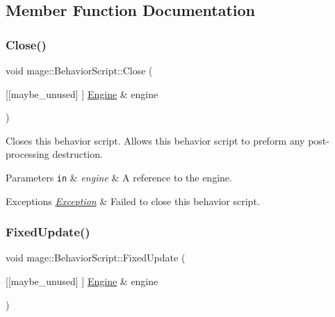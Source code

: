 \subsection{Member Function Documentation}
\hypertarget{classmage_1_1_behavior_script_a5a8d2d38b369e193bf8cc20a74708397}{}\label{classmage_1_1_behavior_script_a5a8d2d38b369e193bf8cc20a74708397} 
\subsubsection{\texorpdfstring{Close()}{Close()}}
{\footnotesize\ttfamily void mage\+::\+Behavior\+Script\+::\+Close (\begin{DoxyParamCaption}\item[{\mbox{[}\mbox{[}maybe\+\_\+unused\mbox{]} \mbox{]} \hyperlink{classmage_1_1_engine}{Engine} \&}]{engine }\end{DoxyParamCaption})\hspace{0.3cm}{\ttfamily [virtual]}}

Closes this behavior script. Allows this behavior script to preform any post-\/processing destruction.


\begin{DoxyParams}[1]{Parameters}
\mbox{\tt in}  & {\em engine} & A reference to the engine. \\
\hline
\end{DoxyParams}

\begin{DoxyExceptions}{Exceptions}
{\em \hyperlink{classmage_1_1_exception}{Exception}} & Failed to close this behavior script. \\
\hline
\end{DoxyExceptions}
\hypertarget{classmage_1_1_behavior_script_ae4b9cb7f3ee9f96d69682aef42f8bb12}{}\label{classmage_1_1_behavior_script_ae4b9cb7f3ee9f96d69682aef42f8bb12} 
\subsubsection{\texorpdfstring{Fixed\+Update()}{FixedUpdate()}}
{\footnotesize\ttfamily void mage\+::\+Behavior\+Script\+::\+Fixed\+Update (\begin{DoxyParamCaption}\item[{\mbox{[}\mbox{[}maybe\+\_\+unused\mbox{]} \mbox{]} \hyperlink{classmage_1_1_engine}{Engine} \&}]{engine }\end{DoxyParamCaption})\hspace{0.3cm}{\ttfamily [virtual]}}

